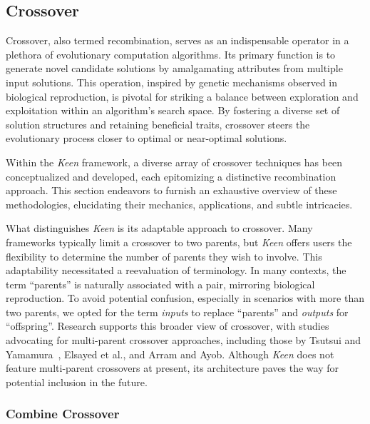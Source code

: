\subsection{Crossover}
\label{sec:keen:op:cx}
  Crossover, also termed recombination, serves as an indispensable operator in 
  a plethora of evolutionary computation algorithms. Its primary function is to 
  generate novel candidate solutions by amalgamating attributes from multiple 
  input solutions. This operation, inspired by genetic mechanisms observed in 
  biological reproduction, is pivotal for striking a balance between 
  exploration and exploitation within an algorithm's search space. By fostering 
  a diverse set of solution structures and retaining beneficial traits, 
  crossover steers the evolutionary process closer to optimal or near-optimal 
  solutions.

  Within the \textit{Keen} framework, a diverse array of crossover techniques 
  has been conceptualized and developed, each epitomizing a distinctive 
  recombination approach. This section endeavors to furnish an exhaustive 
  overview of these methodologies, elucidating their mechanics, applications, 
  and subtle intricacies.

  What distinguishes \textit{Keen} is its adaptable approach to crossover. Many 
  frameworks typically limit a crossover to two parents, but \textit{Keen} 
  offers users the flexibility to determine the number of parents they wish to 
  involve. This adaptability necessitated a reevaluation of terminology. In 
  many contexts, the term \enquote{parents} is naturally associated with a 
  pair, mirroring biological reproduction. To avoid potential confusion, 
  especially in scenarios with more than two parents, we opted for the term 
  \textit{inputs} to replace \enquote{parents} and \textit{outputs} for 
  \enquote{offspring}. Research supports this broader view of crossover, with 
  studies advocating for multi-parent crossover approaches, including those by 
  Tsutsui and Yamamura~\autocite{tsutsuiMultiparentRecombinationSimplex1999}, 
  Elsayed et al.\autocite{elsayedGANewMultiparent2011}, and Arram and 
  Ayob\autocite{arramNovelMultiparentOrder2019}. Although \textit{Keen} does 
  not feature multi-parent crossovers at present, its architecture paves the 
  way for potential inclusion in the future.
  
  \subsubsection{Combine Crossover}
  \label{sec:keen:op:cx:combine}
    \Blindtext
